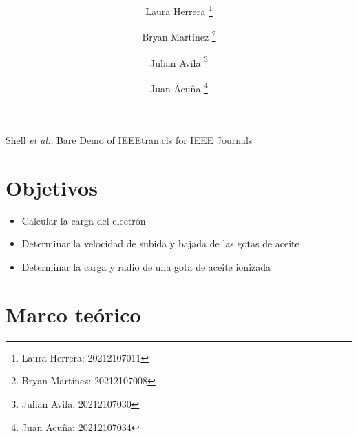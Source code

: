 \documentclass[journal, table]{IEEEtran}
\begin{document}
\title{\textbf{} \\
    \small{}}

\author[*]{Laura Herrera
    \thanks{Laura Herrera: 20212107011}}
\author[*]{Bryan Martínez
    \thanks{Bryan Martínez: 20212107008}}
\author[*]{Julian Avila
    \thanks{Julian Avila: 20212107030}}
\author[*]{Juan Acuña
    \thanks{Juan Acuña: 20212107034}}



\markboth{}
{Shell \MakeLowercase{\textit{et al.}}: Bare Demo of IEEEtran.cls for IEEE Journals}

\maketitle

\begin{abstract}

\end{abstract}

\begin{IEEEkeywords}

\end{IEEEkeywords}

\begin{abstract}

\end{abstract}

\begin{IEEEkeywords}

\end{IEEEkeywords}

\section{Objetivos}
\begin{itemize}
    \item Calcular la carga del electrón
    \item Determinar la velocidad de subida y bajada de las gotas de aceite
    \item Determinar la carga y radio de una gota de aceite ionizada
\end{itemize}

\section{Marco teórico}
\end{document}
